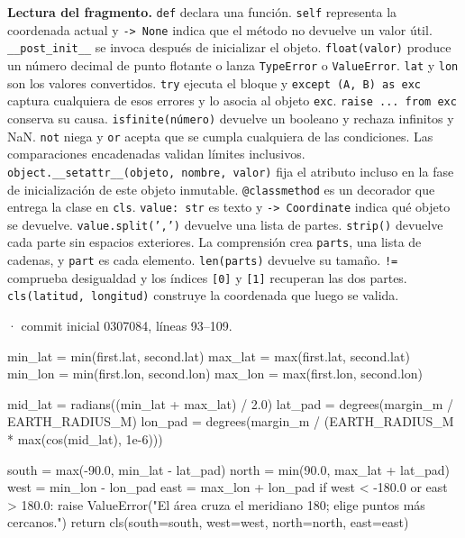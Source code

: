 \documentclass[11pt,a4paper]{article}
\begin{document}
\textbf{Lectura del fragmento.} \texttt{def} declara una función. \texttt{self} representa la coordenada actual y \texttt{-\textgreater{} None} indica que el método no devuelve un valor útil. \texttt{\_\_post\_init\_\_} se invoca después de inicializar el objeto. \texttt{float(valor)} produce un número decimal de punto flotante o lanza \texttt{TypeError} o \texttt{ValueError}. \texttt{lat} y \texttt{lon} son los valores convertidos. \texttt{try} ejecuta el bloque y \texttt{except (A, B) as exc} captura cualquiera de esos errores y lo asocia al objeto \texttt{exc}. \texttt{raise ... from exc} conserva su causa. \texttt{isfinite(número)} devuelve un booleano y rechaza infinitos y NaN. \texttt{not} niega y \texttt{or} acepta que se cumpla cualquiera de las condiciones. Las comparaciones encadenadas validan límites inclusivos. \texttt{object.\_\_setattr\_\_(objeto, nombre, valor)} fija el atributo incluso en la fase de inicialización de este objeto inmutable. \texttt{@classmethod} es un decorador que entrega la clase en \texttt{cls}. \texttt{value: str} es texto y \texttt{-\textgreater{} Coordinate} indica qué objeto se devuelve. \texttt{value.split(',')} devuelve una lista de partes. \texttt{strip()} devuelve cada parte sin espacios exteriores. La comprensión crea \texttt{parts}, una lista de cadenas, y \texttt{part} es cada elemento. \texttt{len(parts)} devuelve su tamaño. \texttt{!=} comprueba desigualdad y los índices \texttt{[0]} y \texttt{[1]} recuperan las dos partes. \texttt{cls(latitud, longitud)} construye la coordenada que luego se valida.


\smallskip
{\footnotesize\texttt{} · commit inicial 0307084, líneas 93--109.}\par
\begin{Codigo}[firstnumber=93]

        min_lat = min(first.lat, second.lat)
        max_lat = max(first.lat, second.lat)
        min_lon = min(first.lon, second.lon)
        max_lon = max(first.lon, second.lon)

        mid_lat = radians((min_lat + max_lat) / 2.0)
        lat_pad = degrees(margin_m / EARTH_RADIUS_M)
        lon_pad = degrees(margin_m / (EARTH_RADIUS_M * max(cos(mid_lat), 1e-6)))

        south = max(-90.0, min_lat - lat_pad)
        north = min(90.0, max_lat + lat_pad)
        west = min_lon - lon_pad
        east = max_lon + lon_pad
        if west < -180.0 or east > 180.0:
            raise ValueError("El área cruza el meridiano 180; elige puntos más cercanos.")
        return cls(south=south, west=west, north=north, east=east)
\end{Codigo}
\end{document}
